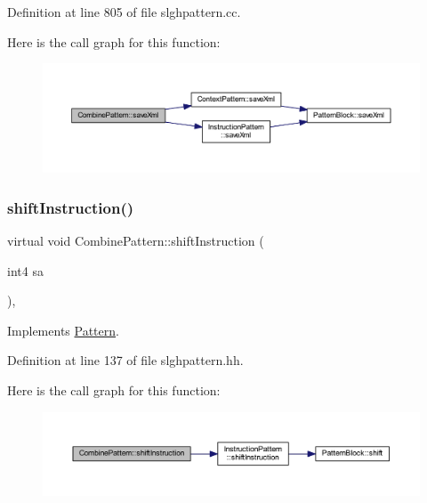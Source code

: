 Definition at line 805 of file slghpattern.\+cc.

Here is the call graph for this function\+:
\nopagebreak
\begin{figure}[H]
\begin{center}
\leavevmode
\includegraphics[width=350pt]{class_combine_pattern_a77f1097e85459ca4ee70dad774df6535_cgraph}
\end{center}
\end{figure}
\mbox{\label{class_combine_pattern_a2c69b2e5558a592ff2677c576da440bd}} 
\subsubsection{\texorpdfstring{shiftInstruction()}{shiftInstruction()}}
{\footnotesize\ttfamily virtual void Combine\+Pattern\+::shift\+Instruction (\begin{DoxyParamCaption}\item[{int4}]{sa }\end{DoxyParamCaption})\hspace{0.3cm}{\ttfamily [inline]}, {\ttfamily [virtual]}}



Implements \mbox{\hyperlink{class_pattern_a8a84c1487128e33cdc27c2069eb4c02a}{Pattern}}.



Definition at line 137 of file slghpattern.\+hh.

Here is the call graph for this function\+:
\nopagebreak
\begin{figure}[H]
\begin{center}
\leavevmode
\includegraphics[width=350pt]{class_combine_pattern_a2c69b2e5558a592ff2677c576da440bd_cgraph}
\end{center}
\end{figure}
\mbox{\label{class_combine_pattern_ad6eafd26d824e0e449991267f30d818b}} 
